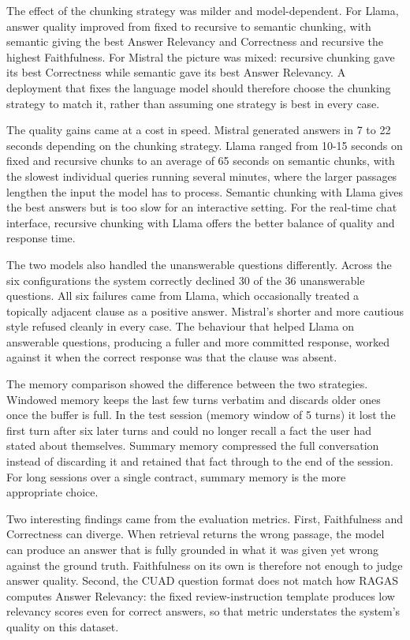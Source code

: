 The effect of the chunking strategy was milder and model-dependent. For Llama, answer quality improved from fixed to recursive to semantic chunking, with semantic giving the best Answer Relevancy and Correctness and recursive the highest Faithfulness. For Mistral the picture was mixed: recursive chunking gave its best Correctness while semantic gave its best Answer Relevancy. A deployment that fixes the language model should therefore choose the chunking strategy to match it, rather than assuming one strategy is best in every case.

The quality gains came at a cost in speed. Mistral generated answers in 7 to 22 seconds depending on the chunking strategy. Llama ranged from 10-15 seconds on fixed and recursive chunks to an average of 65 seconds on semantic chunks, with the slowest individual queries running several minutes, where the larger passages lengthen the input the model has to process. Semantic chunking with Llama gives the best answers but is too slow for an interactive setting. For the real-time chat interface, recursive chunking with Llama offers the better balance of quality and response time.

The two models also handled the unanswerable questions differently. Across the six configurations the system correctly declined 30 of the 36 unanswerable questions. All six failures came from Llama, which occasionally treated a topically adjacent clause as a positive answer. Mistral's shorter and more cautious style refused cleanly in every case. The behaviour that helped Llama on answerable questions, producing a fuller and more committed response, worked against it when the correct response was that the clause was absent.

The memory comparison showed the difference between the two strategies. Windowed memory keeps the last few turns verbatim and discards older ones once the buffer is full. In the test session (memory window of 5 turns) it lost the first turn after six later turns and could no longer recall a fact the user had stated about themselves. Summary memory compressed the full conversation instead of discarding it and retained that fact through to the end of the session. For long sessions over a single contract, summary memory is the more appropriate choice.

Two interesting findings came from the evaluation metrics. First, Faithfulness and Correctness can diverge. When retrieval returns the wrong passage, the model can produce an answer that is fully grounded in what it was given yet wrong against the ground truth. Faithfulness on its own is therefore not enough to judge answer quality. Second, the CUAD question format does not match how RAGAS computes Answer Relevancy: the fixed review-instruction template produces low relevancy scores even for correct answers, so that metric understates the system's quality on this dataset.

